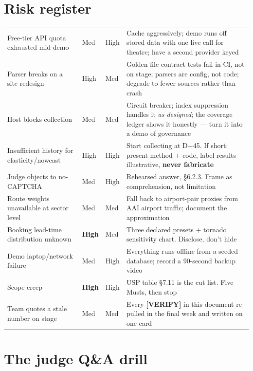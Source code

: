 \section{Risk register}

\begin{center}
\footnotesize
\begin{tabularx}{\textwidth}{@{}L{3.6cm} C{1.1cm} C{1.1cm} X@{}}
\toprule
{} &  &  &  \\
\midrule
Free-tier API quota exhausted mid-demo & Med & High & Cache aggressively; demo runs off stored data with one live call for theatre; have a second provider keyed \\
Parser breaks on a site redesign & High & Med & Golden-file contract tests fail in CI, not on stage; parsers are config, not code; degrade to fewer sources rather than crash \\
Host blocks collection & Med & Med & Circuit breaker; index suppression handles it \emph{as designed}; the coverage ledger shows it honestly --- turn it into a demo of governance \\
Insufficient history for elasticity/nowcast & High & High & Start collecting at D$-$45. If short: present method $+$ code, label results illustrative, \textbf{never fabricate} \\
Judge objects to no-CAPTCHA & Med & High & Rehearsed answer, \S6.2.3. Frame as comprehension, not limitation \\
Route weights unavailable at sector level & Med & Med & Fall back to airport-pair proxies from AAI airport traffic; document the approximation \\
Booking lead-time distribution unknown & \textbf{High} & Med & Three declared presets $+$ tornado sensitivity chart. Disclose, don't hide \\
Demo laptop/network failure & Med & High & Everything runs offline from a seeded database; record a 90-second backup video \\
Scope creep & \textbf{High} & High & USP table \S7.11 is the cut list. Five Musts, then stop \\
Team quotes a stale number on stage & Med & Med & Every \textbf{[VERIFY]} in this document re-pulled in the final week and written on one card \\
\bottomrule
\end{tabularx}
\end{center}

\section{The judge Q\&A drill}

